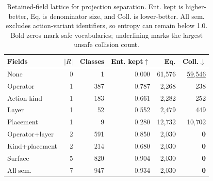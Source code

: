 \begin{table}[t]
\centering
\caption{Retained-field lattice for projection separation.  Ent. kept is higher-better, Eq. is denominator size, and Coll. is lower-better.  All sem. excludes action-variant identifiers, so entropy can remain below 1.0.  Bold zeros mark safe vocabularies; underlining marks the largest unsafe collision count.}
\label{tab:resolution-lattice}
\footnotesize
\setlength{\tabcolsep}{2.5pt}
\begin{tabular}{@{}lrrrrr@{}}
\toprule
Fields & $|R|$ & Classes & Ent. kept$\uparrow$ & Eq. & Coll.$\downarrow$ \\
\midrule
None & 0 & 1 & 0.000 & 61,576 & \underline{59,546} \\
Operator & 1 & 387 & 0.787 & 2,268 & 238 \\
Action kind & 1 & 183 & 0.661 & 2,282 & 252 \\
Layer & 1 & 52 & 0.552 & 2,479 & 449 \\
Placement & 1 & 9 & 0.280 & 12,732 & 10,702 \\
Operator+layer & 2 & 591 & 0.850 & 2,030 & \textbf{0} \\
Kind+placement & 2 & 214 & 0.680 & 2,030 & \textbf{0} \\
Surface & 5 & 820 & 0.904 & 2,030 & \textbf{0} \\
All sem. & 7 & 947 & 0.934 & 2,030 & \textbf{0} \\
\bottomrule
\end{tabular}
\end{table}
